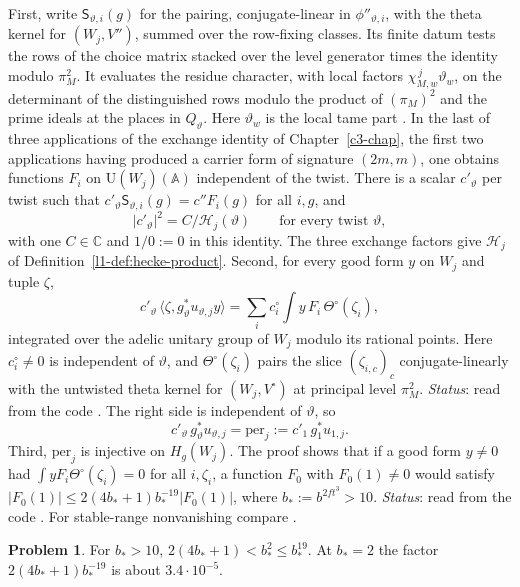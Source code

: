 \documentclass[reqno]{amsart}
\newcounter{chap}
\theoremstyle{definition}
\newtheorem{problem}{Problem}[section]
\theoremstyle{plain}
\theoremstyle{remark}
\newcommand{\C}{{\mathbb{C}}}
\newcommand{\Hc}{{\mathcal{H}}}
\newcommand{\per}{\mathrm{per}}
\newcommand{\vt}{\vartheta}
\begin{document}
First, write \(\mathsf S_{\vt,i}(g)\) for the pairing, conjugate-linear in \(\phi''_{\vt,i}\), with the theta kernel for \((W_j,V'')\), summed over the row-fixing classes.  Its finite datum tests the rows of the choice matrix stacked over the level generator times the identity modulo \(\pi_M^2\).  It evaluates the residue character, with local factors \(\chi_{M,w}^{\,j}\vt_w\), on the determinant of the distinguished rows modulo the product of \((\pi_M)^2\) and the prime ideals at the places in \(Q_\vartheta\).  Here \(\vt_w\) is the local tame part \cite[LevelAndTwists, line 336, GluedLattices, lines 272--278, 422--425 and GluingMaps, lines 249--255]{GL}.  In the last of three applications of the exchange identity of Chapter~\ref{c3-chap}, the first two applications having produced a carrier form of signature \((2m,m)\), one obtains functions \(F_i\) on \(\mathrm U(W_j)(\mathbb A)\) independent of the twist.  There is a scalar \(c'_\vt\) per twist such that \(c'_\vt\mathsf S_{\vt,i}(g)=c''F_i(g)\) for all \(i,g\), and
\[
  \lvert c'_\vt\rvert^2 = C/\Hc_j(\vt)\qquad\text{for every twist }\vt,
\]
with one \(C\in\C\) and \(1/0:=0\) in this identity.  The three exchange factors give \(\Hc_j\) of Definition~\ref{l1-def:hecke-product}.  Second, for every good form \(y\) on \(W_j\) and tuple \(\zeta\),
\[
  c'_\vt\,\langle\zeta, g_\vt^*u_{\vt,j}y\rangle = \sum_i c^\circ_i\int y\,F_i\,\Theta^\circ(\zeta_i),
\]
integrated over the adelic unitary group of \(W_j\) modulo its rational points.  Here \(c^\circ_i\ne0\) is independent of \(\vt\), and \(\Theta^\circ(\zeta_i)\) pairs the slice \((\zeta_{i,c})_c\) conjugate-linearly with the untwisted theta kernel for \((W_j,V^\circ)\) at principal level \(\pi_M^2\).  \emph{Status}: read from the code \cite[OneExchange, line 93, ThreeExchanges, lines 181, 284, 748 and GluingMaps, lines 293--319, 999--1048]{GL}.  The right side is independent of \(\vt\), so
\begin{equation}\label{eq:period-lift}
  c'_\vt\, g_\vt^*u_{\vt,j} = \per_j := c'_1\, g_1^*u_{1,j} .
\end{equation}
Third, \(\per_j\) is injective on \(H_g(W_j)\).  The proof shows that if a good form \(y\ne0\) had \(\int yF_i\Theta^\circ(\zeta_i)=0\) for all \(i,\zeta_i\), a function \(F_0\) with \(F_0(1)\ne0\) would satisfy \(|F_0(1)|\le 2(4b_*+1)b_*^{-19}|F_0(1)|\), where \(b_*:=b^{2ft^3}>10\).  \emph{Status}: read from the code \cite[ProductsSpan, lines 717, 855--907]{GL}.  For stable-range nonvanishing compare \cite{Li92}.

\begin{problem}\label{pr:peak}
For \(b_*>10\), \(2(4b_*+1)<b_*^2\le b_*^{19}\).  At \(b_*=2\) the factor \(2(4b_*+1)b_*^{-19}\) is about \(3.4\cdot10^{-5}\).
\end{problem}
\end{document}
